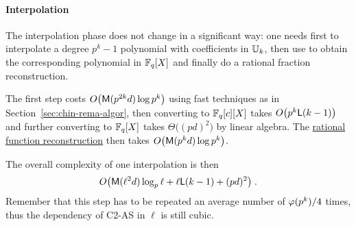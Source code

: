 \paragraph{Interpolation}
The interpolation phase does not change in a significant way: one
needs first to interpolate a degree $p^k-1$ polynomial with
coefficients in $\mathbb{U}_k$, then use
\hyperref[alg:push-down]{} to obtain the corresponding
polynomial in $\mathbb{F}_q[X]$ and finally do a rational fraction
reconstruction.

The first step costs $O\bigl(\mathsf{M}(p^{2k}d)\log p^k\bigr)$ using fast
techniques as in Section~\ref{sec:chin-rema-algor}, then converting to
$\mathbb{F}_q[c][X]$ takes $O\bigl(p^k\mathsf{L}(k-1)\bigr)$ and further
converting to $\mathbb{F}_q[X]$ takes $\Theta\bigl((pd)^2\bigr)$ by linear
algebra. The \hyperref[sec:eucl-algor-rati]{rational function
  reconstruction} then takes $O\bigl(\mathsf{M}(p^kd)\log p^k\bigr)$.

The overall complexity of one interpolation is then
\begin{equation}
  \label{eq:C2-AS:complexity:interp}
  O\bigl(\mathsf{M}(\ell^2d)\log_p\ell + \ell\mathsf{L}(k-1) + (pd)^2\bigr)
  \;\text{.}
\end{equation}
Remember that this step has to be repeated an average number of
$\varphi(p^k)/4$ times, thus the dependency of C2-AS in $\ell$ is still cubic.



%
